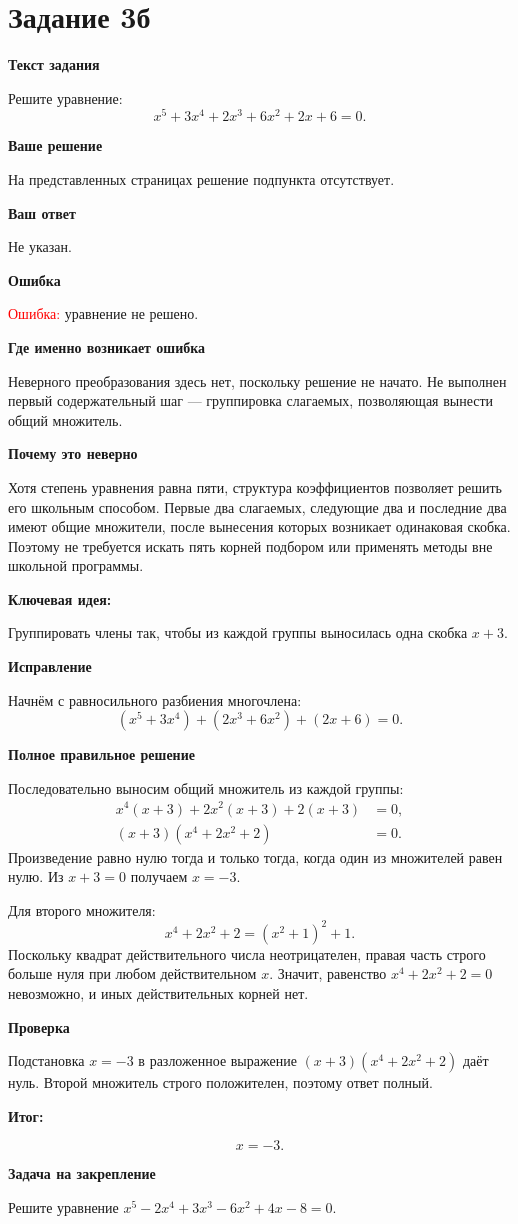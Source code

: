 \documentclass[12pt,a4paper]{article}
\newcommand{\parthead}[1]{\par\medskip\textbf{#1}\par\smallskip}
\begin{document}
\newpage
{}\label{task:3b}
\section*{Задание 3б}
\parthead{Текст задания}
Решите уравнение:
\[
x^5+3x^4+2x^3+6x^2+2x+6=0.
\]
\parthead{Ваше решение}
На представленных страницах решение подпункта отсутствует.
\parthead{Ваш ответ}
Не указан.
\parthead{Ошибка}
\textcolor{red}{Ошибка:} уравнение не решено.
\parthead{Где именно возникает ошибка}
Неверного преобразования здесь нет, поскольку решение не начато. Не выполнен первый содержательный шаг --- группировка слагаемых, позволяющая вынести общий множитель.
\parthead{Почему это неверно}
Хотя степень уравнения равна пяти, структура коэффициентов позволяет решить его школьным способом. Первые два слагаемых, следующие два и последние два имеют общие множители, после вынесения которых возникает одинаковая скобка. Поэтому не требуется искать пять корней подбором или применять методы вне школьной программы.
\parthead{\textcolor{blue!60!black}{Ключевая идея:}}
Группировать члены так, чтобы из каждой группы выносилась одна скобка $x+3$.
\parthead{Исправление}
Начнём с равносильного разбиения многочлена:
\[
(x^5+3x^4)+(2x^3+6x^2)+(2x+6)=0.
\]
\parthead{Полное правильное решение}
Последовательно выносим общий множитель из каждой группы:
\begin{align*}
x^4(x+3)+2x^2(x+3)+2(x+3)&=0,\\
(x+3)(x^4+2x^2+2)&=0.
\end{align*}
Произведение равно нулю тогда и только тогда, когда один из множителей равен нулю. Из $x+3=0$ получаем $x=-3$.

Для второго множителя:
\[
x^4+2x^2+2=(x^2+1)^2+1.
\]
Поскольку квадрат действительного числа неотрицателен, правая часть строго больше нуля при любом действительном $x$. Значит, равенство $x^4+2x^2+2=0$ невозможно, и иных действительных корней нет.
\parthead{Проверка}
Подстановка $x=-3$ в разложенное выражение $(x+3)(x^4+2x^2+2)$ даёт нуль. Второй множитель строго положителен, поэтому ответ полный.
\parthead{\textcolor{teal!60!black}{Итог:}}
\[
\boxed{x=-3.}
\]
\parthead{Задача на закрепление}
Решите уравнение $x^5-2x^4+3x^3-6x^2+4x-8=0$.

\newpage
{}\label{task:4a}
\end{document}
